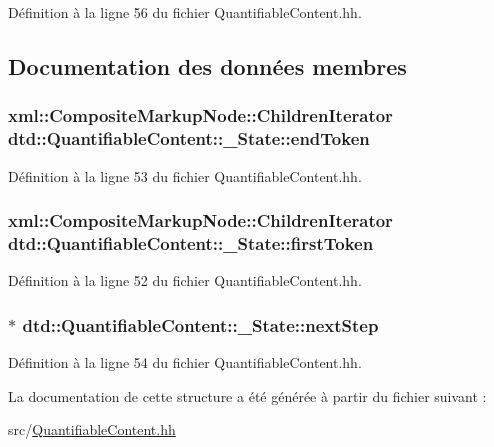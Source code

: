 Définition à la ligne 56 du fichier QuantifiableContent.hh.



\subsection{Documentation des données membres}
\hypertarget{structdtd_1_1_quantifiable_content_1_1___state_a926d0bb0e8f3a582834cf057be23d79f}{
\subsubsection[{endToken}]{\setlength{\rightskip}{0pt plus 5cm}xml::CompositeMarkupNode::ChildrenIterator {\bf dtd::QuantifiableContent::\_\-State::endToken}}}
\label{structdtd_1_1_quantifiable_content_1_1___state_a926d0bb0e8f3a582834cf057be23d79f}


Définition à la ligne 53 du fichier QuantifiableContent.hh.

\hypertarget{structdtd_1_1_quantifiable_content_1_1___state_a0d1bdfb22956d9f0f8a3b9c474660d11}{
\subsubsection[{firstToken}]{\setlength{\rightskip}{0pt plus 5cm}xml::CompositeMarkupNode::ChildrenIterator {\bf dtd::QuantifiableContent::\_\-State::firstToken}}}
\label{structdtd_1_1_quantifiable_content_1_1___state_a0d1bdfb22956d9f0f8a3b9c474660d11}


Définition à la ligne 52 du fichier QuantifiableContent.hh.

\hypertarget{structdtd_1_1_quantifiable_content_1_1___state_aab28474ad81a306c6ec1a450f941089b}{
\subsubsection[{nextStep}]{$\ast$ {\bf dtd::QuantifiableContent::\_\-State::nextStep}}}
\label{structdtd_1_1_quantifiable_content_1_1___state_aab28474ad81a306c6ec1a450f941089b}


Définition à la ligne 54 du fichier QuantifiableContent.hh.



La documentation de cette structure a été générée à partir du fichier suivant :\begin{DoxyCompactItemize}
\item 
src/\hyperlink{_quantifiable_content_8hh}{QuantifiableContent.hh}\end{DoxyCompactItemize}
